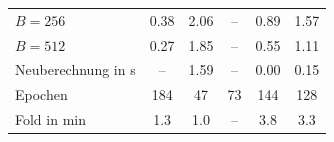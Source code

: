 \begin{table}[tbp]
\begin{tabular}{@{}l *{5}{c}@{}}
\quad \phantom{Epoche in s bei }$B=256$ & \num{0.38} & \num{2.06} & -- & \num{0.89} & \num{1.57} \\
\quad \phantom{Epoche in s bei }$B=512$ & \num{0.27} & \num{1.85} & -- & \num{0.55} & \num{1.11} \\
\quad Neuberechnung in s & -- & \num{1.59} & -- & \num{0.00} & \num{0.15} \\
\quad Epochen & \num{184} & \num{47} & \num{73} & \num{144} & \num{128} \\
\quad Fold in min & \num{1.3} & \num{1.0} & -- & \num{3.8} & \num{3.3} \\
\bottomrule
\end{tabular}
\end{table}
